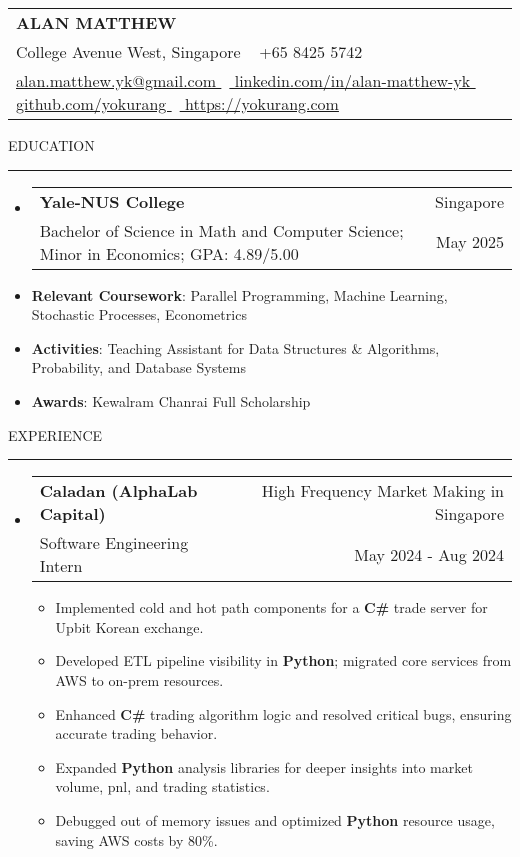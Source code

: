 \documentclass[letterpaper, 11pt]{article}
\makeatletter
\def\sectionlineskip{\medskip}
\def\sectionskip{\medskip}
\def\namesize{\LARGE}
\newcommand{\ResumeHeader}[6]{
  \noindent
  \begin{tabularx}{\textwidth}{>{\centering\arraybackslash}X}
    \namesize\MakeUppercase{\textbf{\fullname}} \\
    #1 \textbar\ #2 \\
    #3 \textbar\ #4 \textbar\ #5 \textbar\ #6 \\
  \end{tabularx}
}
\def \fullname { Alan Matthew }
\def \linkedinlink { https://www.linkedin.com/in/alan-matthew-yk }
\def \linkedintext { linkedin.com/in/alan-matthew-yk }
\def \phonenumber { +65 8425 5742 }
\def \githublink { https://github.com/yokurang }
\def \githubtext { github.com/yokurang }
\def \emaillink { mailto:alan.matthew.yk@gmail.com }
\def \emailtext { alan.matthew.yk@gmail.com }
\def \websitelink { https://yokurang-com.vercel.app/ }
\def \websitetext { https://yokurang.com }
\def \address { 28 College Avenue West, Singapore }
\def \headertype {\ResumeHeader}
\def \linkedin {\href{\linkedinlink}{\linkedintext}}
\def \phone {{\phonenumber}}
\def \email {\href{\emaillink}{\emailtext}}
\def \github {\href{\githublink}{\githubtext}}
\def \website {\href{\websitelink}{\websitetext}}
\newcommand{\SectionHeading}[1]{
  \sectionskip
  \raggedright\raggedbottom\MakeUppercase{\large{#1}}
  \sectionlineskip
  \hrule
  \color{black}
}
\newcommand{\ResumeEntryTSDL}[4]{
  \vspace{1pt}\item
    \begin{tabular*}{\textwidth}[t]{l@{\extracolsep{\fill}}r} 
      \textbf{#1} & #2 \\
      #3 & #4 \\
    \end{tabular*}\vspace{-2.835pt} %
}
\newcommand{\ResumeItem}[2]{
  \item{
    \textbf{#1}{: #2 \vspace{-2.835pt}}
  }
}
\newcommand{\ResumeItemDefault}[1]{
  \item{
    #1 \vspace{-2.835pt}
  }
}
\newcommand{\ResumeSubItem}[2]{\ResumeItem{#1}{#2}\vspace{-2.835pt}}
\newcommand{\ResumeEntryStart}{\begin{itemize}[leftmargin=0mm, label={}]}
\newcommand{\ResumeEntryEnd}{\end{itemize}\vspace{-2.835pt}} %
\newcommand{\ResumeItemListStart}{\begin{itemize}[leftmargin=5mm, label=$\bullet$, itemsep=1mm, parsep=1mm]} %
\newcommand{\ResumeItemListEnd}{\end{itemize}}
\makeatother
\begin{document}
  \headertype{\address}{\phone}{\email}{\linkedin}{\github}{\website}
  
  \SectionHeading{Education}
  \ResumeEntryStart
    \ResumeEntryTSDL{Yale-NUS College} {Singapore}
    {Bachelor of Science in Math and Computer Science; Minor in Economics; GPA: 4.89/5.00} {May 2025}
    \ResumeSubItem{Relevant Coursework}{Parallel Programming, Machine Learning, Stochastic Processes, Econometrics}
    \ResumeSubItem{Activities}{Teaching Assistant for Data Structures \& Algorithms, Probability, and Database Systems}
    \ResumeSubItem{Awards}{Kewalram Chanrai Full Scholarship}
  \ResumeEntryEnd

  \vspace{5pt}

  \SectionHeading{Experience}

  \ResumeEntryStart
  \ResumeEntryTSDL{Caladan (AlphaLab Capital)}{High Frequency Market Making in Singapore}{Software Engineering Intern}{May 2024 - Aug 2024}
  \ResumeItemListStart
  \ResumeItemDefault{Implemented cold and hot path components for a \textbf{C\#} trade server for Upbit Korean exchange.}
  \ResumeItemDefault{Developed ETL pipeline visibility in \textbf{Python}; migrated core services from AWS to on-prem resources.}
  \ResumeItemDefault{Enhanced \textbf{C\#} trading algorithm logic and resolved critical bugs, ensuring accurate trading behavior.}
  \ResumeItemDefault{Expanded \textbf{Python} analysis libraries for deeper insights into market volume, pnl, and trading statistics.}
  \ResumeItemDefault{Debugged out of memory issues and optimized \textbf{Python} resource usage, saving AWS costs by 80\%.}
  \ResumeItemListEnd
  \ResumeEntryEnd

\end{document}
